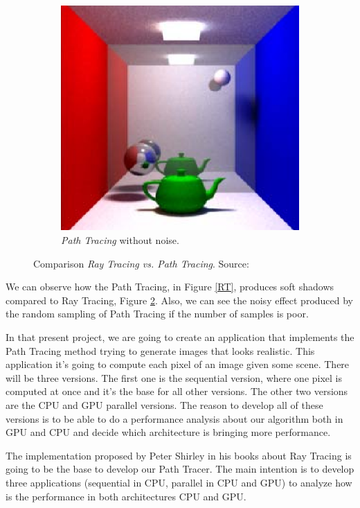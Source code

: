\documentclass[titlepage,12pt]{report}
\begin{document}
\begin{figure}[H]
\begin{subfigure}{.3\textwidth}
		\includegraphics[width=.8\textwidth]{media/PathTracingMD.png}	
		\caption{\textit{Path Tracing} without noise.}
		\label{PT}
	\end{subfigure}
	\caption{Comparison \textit{Ray Tracing vs. Path Tracing}. Source: \citep[pp.~23--29]{Cassagnabere2004}}
\end{figure}

We can observe how the Path Tracing, in Figure \ref{RT}, produces soft shadows compared to Ray Tracing, Figure \ref{PT}. Also, we can see the noisy effect produced by the random sampling of Path Tracing if the number of samples is poor.

In that present project, we are going to create an application that implements the Path Tracing method trying to generate images that looks realistic. This application it's going to compute each pixel of an image given some scene. There will be three versions. The first one is the sequential version, where one pixel is computed at once and it's the base for all other versions. The other two versions are the CPU and GPU parallel versions. The reason to develop all of these versions is to be able to do a performance analysis about our algorithm both in GPU and CPU and decide which architecture is bringing more performance.

The implementation proposed by Peter Shirley in his books about Ray Tracing  \citep{ShirleyRTA, ShirleyRTB, ShirleyRTC} is going to be the base to develop our Path Tracer. The main intention is to develop three applications (sequential in CPU, parallel in CPU and GPU) to analyze how is the performance in both architectures CPU and GPU.
\end{document}
